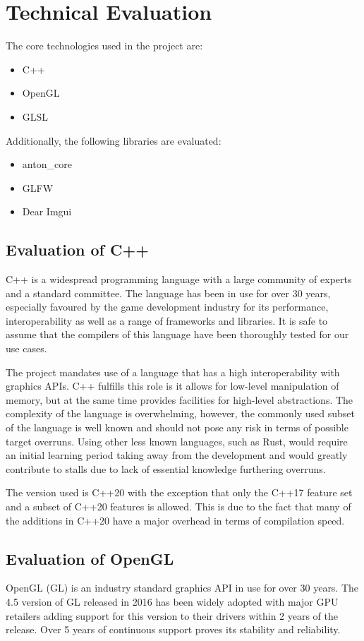 \documentclass[12pt, a4paper]{article}
\newenvironment{itemlist}
{
  \vspace{-0.5\topsep}
  \begin{itemize}
    \setlength{\itemsep}{4pt}
    \setlength{\parskip}{0pt}
} {
  \end{itemize}
  \vspace{-0.5\topsep}
}
\begin{document}
\section{Technical Evaluation}
The core technologies used in the project are:
\begin{itemlist}
  \item C++
  \item OpenGL
  \item GLSL
\end{itemlist}

Additionally, the following libraries are evaluated:
\begin{itemlist}
  \item anton{\_}core
  \item GLFW
  \item Dear Imgui
\end{itemlist}

\subsection{Evaluation of C++}
C++ is a widespread programming language with a large community of experts and a
standard committee. The language has been in use for over 30 years, especially
favoured by the game development industry for its performance, interoperability
as well as a range of frameworks and libraries. It is safe to assume that the
compilers of this language have been thoroughly tested for our use cases.

The project mandates use of a language that has a high interoperability with
graphics APIs. C++ fulfills this role is it allows for low-level manipulation of
memory, but at the same time provides facilities for high-level abstractions.
The complexity of the language is overwhelming, however, the commonly used
subset of the language is well known and should not pose any risk in terms of
possible target overruns. Using other less known languages, such as Rust, would
require an initial learning period taking away from the development and would
greatly contribute to stalls due to lack of essential knowledge furthering
overruns.

The version used is C++20 with the exception that only the C++17 feature set and
a subset of C++20 features is allowed. This is due to the fact that many of the
additions in C++20 have a major overhead in terms of compilation speed.

\subsection{Evaluation of OpenGL}
OpenGL (GL) is an industry standard graphics API in use for over 30 years. The
4.5 version of GL released in 2016 has been widely adopted with major GPU
retailers adding support for this version to their drivers within 2 years of the
release. Over 5 years of continuous support proves its stability and
reliability.
\end{document}
